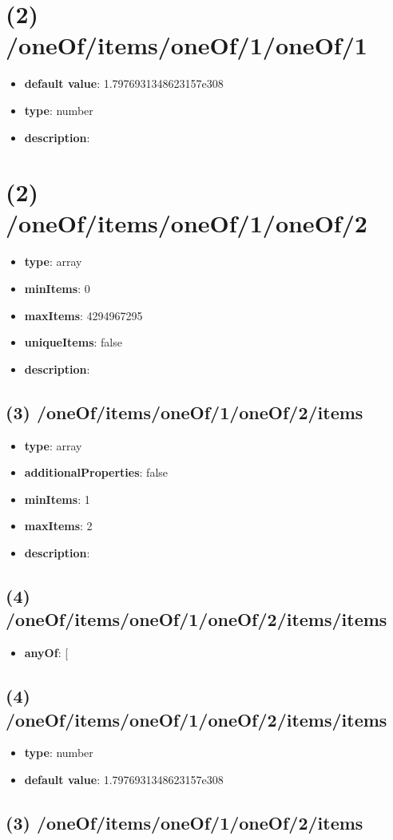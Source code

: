 \section{(2) /oneOf/items/oneOf/1/oneOf/1}
\begin{itemize}[leftmargin=2em]\item {\bf default value}: 1.7976931348623157e308
\item {\bf type}: number
\item {\bf description}: 
\end{itemize}\section{(2) /oneOf/items/oneOf/1/oneOf/2}
\begin{itemize}[leftmargin=2em]\item {\bf type}: array
\item {\bf minItems}: 0
\item {\bf maxItems}: 4294967295
\item {\bf uniqueItems}: false
\item {\bf description}: 
\end{itemize}\subsection{(3) /oneOf/items/oneOf/1/oneOf/2/items}
\begin{itemize}[leftmargin=3em]\item {\bf type}: array
\item {\bf additionalProperties}: false
\item {\bf minItems}: 1
\item {\bf maxItems}: 2
\item {\bf description}: 
\end{itemize}\subsection{(4) /oneOf/items/oneOf/1/oneOf/2/items/items}
\begin{itemize}[leftmargin=4em]\item {\bf anyOf}: [\end{itemize}\subsection{(4) /oneOf/items/oneOf/1/oneOf/2/items/items}
\begin{itemize}[leftmargin=4em]\item {\bf type}: number\item {\bf default value}: 1.7976931348623157e308
\end{itemize}\subsection{(3) /oneOf/items/oneOf/1/oneOf/2/items}
